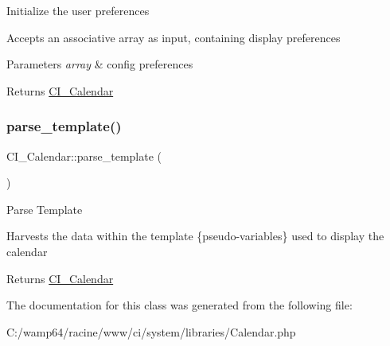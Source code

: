 Initialize the user preferences

Accepts an associative array as input, containing display preferences


\begin{DoxyParams}{Parameters}
{\em array} & config preferences \\
\hline
\end{DoxyParams}
\begin{DoxyReturn}{Returns}
\mbox{\hyperlink{class_c_i___calendar}{C\+I\+\_\+\+Calendar}} 
\end{DoxyReturn}
\mbox{\label{class_c_i___calendar_a8235db008796ae1a36c214575137fd79}} 
\subsubsection{\texorpdfstring{parse\+\_\+template()}{parse\_template()}}
{\footnotesize\ttfamily C\+I\+\_\+\+Calendar\+::parse\+\_\+template (\begin{DoxyParamCaption}{ }\end{DoxyParamCaption})}

Parse Template

Harvests the data within the template \{pseudo-\/variables\} used to display the calendar

\begin{DoxyReturn}{Returns}
\mbox{\hyperlink{class_c_i___calendar}{C\+I\+\_\+\+Calendar}} 
\end{DoxyReturn}


The documentation for this class was generated from the following file\+:\begin{DoxyCompactItemize}
\item 
C\+:/wamp64/racine/www/ci/system/libraries/Calendar.\+php\end{DoxyCompactItemize}
